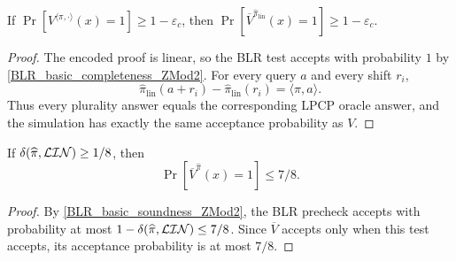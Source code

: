 \begin{lemma}[Completeness]
\label{LPCPToPCP.verifier_completeness}
\leanok
If \(\Pr\!\left[V^{\langle \pi, \cdot \rangle}(x)=1\right]\ge 1-\varepsilon_c\), then \(\Pr\!\left[\overline{V}^{\widehat{\pi}_{\mathrm{lin}}}(x)=1\right]\ge 1-\varepsilon_c\).
\end{lemma}
\begin{proof}\leanok
The encoded proof is linear, so the BLR test accepts with probability \(1\) by
\ref{BLR_basic_completeness_ZMod2}. For every query \(a\) and every shift
\(r_i\),
\[
  \widehat{\pi}_{\mathrm{lin}}(a+r_i)-\widehat{\pi}_{\mathrm{lin}}(r_i)
  = \langle \pi,a\rangle.
\]
Thus every plurality answer equals the corresponding LPCP oracle answer, and
the simulation has exactly the same acceptance probability as \(V\).
\end{proof}


\begin{lemma}
\label{LPCPToPCP.verifier_soundness_far_case_of_isFar}
\leanok
If \(\delta({\widehat{\pi}}, {\mathcal{LIN}}) \geq  1 / 8\), then
\[
  \Pr[\overline V^{\widehat{\pi}}(x)=1]\leq 7/8 .
\]
\end{lemma}
\begin{proof}\leanok
By \ref{BLR_basic_soundness_ZMod2}, the BLR precheck accepts with probability at most
\(1-\delta({\widehat{\pi}}, {\mathcal{LIN}})\leq 7/8\). Since \(\overline V\) accepts only when this test accepts, its
acceptance probability is at most \(7/8\).
\end{proof}

